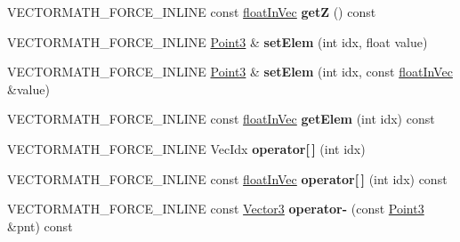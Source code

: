 \begin{DoxyCompactItemize}
V\+E\+C\+T\+O\+R\+M\+A\+T\+H\+\_\+\+F\+O\+R\+C\+E\+\_\+\+I\+N\+L\+I\+NE const \hyperlink{classVectormath_1_1floatInVec}{float\+In\+Vec} {\bfseries getZ} () const
\item 
\mbox{\label{classVectormath_1_1Aos_1_1Point3_ac8c59a40c872e7ead9fb897c3dc012fb}} 
V\+E\+C\+T\+O\+R\+M\+A\+T\+H\+\_\+\+F\+O\+R\+C\+E\+\_\+\+I\+N\+L\+I\+NE \hyperlink{classVectormath_1_1Aos_1_1Point3}{Point3} \& {\bfseries set\+Elem} (int idx, float value)
\item 
\mbox{\label{classVectormath_1_1Aos_1_1Point3_acfaace337e3c100a7f36cdd336409634}} 
V\+E\+C\+T\+O\+R\+M\+A\+T\+H\+\_\+\+F\+O\+R\+C\+E\+\_\+\+I\+N\+L\+I\+NE \hyperlink{classVectormath_1_1Aos_1_1Point3}{Point3} \& {\bfseries set\+Elem} (int idx, const \hyperlink{classVectormath_1_1floatInVec}{float\+In\+Vec} \&value)
\item 
\mbox{\label{classVectormath_1_1Aos_1_1Point3_ab0669a9607d9ca6907d83726404ef394}} 
V\+E\+C\+T\+O\+R\+M\+A\+T\+H\+\_\+\+F\+O\+R\+C\+E\+\_\+\+I\+N\+L\+I\+NE const \hyperlink{classVectormath_1_1floatInVec}{float\+In\+Vec} {\bfseries get\+Elem} (int idx) const
\item 
\mbox{\label{classVectormath_1_1Aos_1_1Point3_aed1afecf3d4ac78dd3287f93eb548f8a}} 
V\+E\+C\+T\+O\+R\+M\+A\+T\+H\+\_\+\+F\+O\+R\+C\+E\+\_\+\+I\+N\+L\+I\+NE Vec\+Idx {\bfseries operator\mbox{[}$\,$\mbox{]}} (int idx)
\item 
\mbox{\label{classVectormath_1_1Aos_1_1Point3_a1bae0342f8597f17fc33f0a02ab9b73a}} 
V\+E\+C\+T\+O\+R\+M\+A\+T\+H\+\_\+\+F\+O\+R\+C\+E\+\_\+\+I\+N\+L\+I\+NE const \hyperlink{classVectormath_1_1floatInVec}{float\+In\+Vec} {\bfseries operator\mbox{[}$\,$\mbox{]}} (int idx) const
\item 
\mbox{\label{classVectormath_1_1Aos_1_1Point3_a03056adfd813ab430597801e23942b65}} 
V\+E\+C\+T\+O\+R\+M\+A\+T\+H\+\_\+\+F\+O\+R\+C\+E\+\_\+\+I\+N\+L\+I\+NE const \hyperlink{classVectormath_1_1Aos_1_1Vector3}{Vector3} {\bfseries operator-\/} (const \hyperlink{classVectormath_1_1Aos_1_1Point3}{Point3} \&pnt) const
\item 

\end{DoxyCompactItemize}
